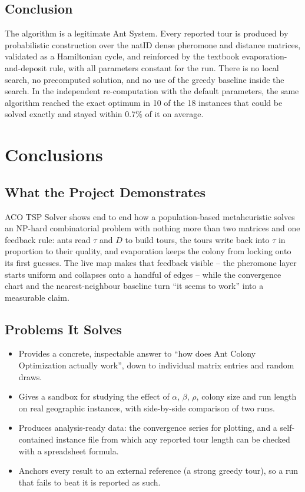 \documentclass[11pt,a4paper]{article}
\begin{document}
\subsection{Conclusion}
The algorithm is a legitimate Ant System. Every reported tour is produced by probabilistic construction
over the natID dense pheromone and distance matrices, validated as a Hamiltonian cycle, and reinforced by
the textbook evaporation-and-deposit rule, with all parameters constant for the run. There is no local
search, no precomputed solution, and no use of the greedy baseline inside the search. In the independent re-computation with
the default parameters, the same algorithm reached the exact optimum in 10 of the 18 instances that could be
solved exactly and stayed within 0.7\% of it on average.

\section{Conclusions}

\subsection{What the Project Demonstrates}
ACO TSP Solver shows end to end how a population-based metaheuristic solves an NP-hard combinatorial
problem with nothing more than two matrices and one feedback rule: ants read $\tau$ and $D$ to build tours,
the tours write back into $\tau$ in proportion to their quality, and evaporation keeps the colony from
locking onto its first guesses. The live map makes that feedback visible -- the pheromone layer starts
uniform and collapses onto a handful of edges -- while the convergence chart and the nearest-neighbour
baseline turn ``it seems to work'' into a measurable claim.

\subsection{Problems It Solves}
\begin{itemize}
  \item Provides a concrete, inspectable answer to ``how does Ant Colony Optimization actually work'', down
        to individual matrix entries and random draws.
  \item Gives a sandbox for studying the effect of $\alpha$, $\beta$, $\rho$, colony size and run length on real
        geographic instances, with side-by-side comparison of two runs.
  \item Produces analysis-ready data: the convergence series for plotting, and a self-contained instance
        file from which any reported tour length can be checked with a spreadsheet formula.
  \item Anchors every result to an external reference (a strong greedy tour), so a run that fails to beat it
        is reported as such.
\end{itemize}
\end{document}
